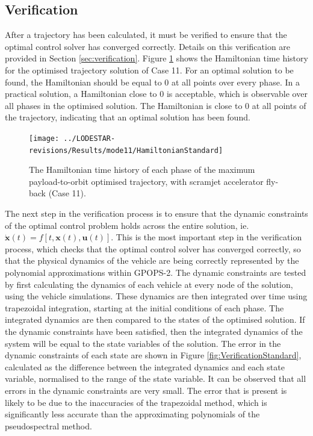 \subsection{Verification}

After a trajectory has been calculated, it must be verified to ensure that the optimal control solver has converged correctly. Details on this verification are provided in Section \ref{sec:verification}. Figure \ref{fig:HamiltonianStandard} shows the Hamiltonian time history for the optimised trajectory solution of Case 11. For an optimal solution to be found, the Hamiltonian should be equal to 0 at all points over every phase. In a practical solution, a Hamiltonian close to 0 is acceptable, which is observable over all phases in the optimised solution. The Hamiltonian is close to 0 at all points of the trajectory, indicating that an optimal solution has been found. 
\begin{figure}[ht]
	\centering
	\texttt{[image: ../LODESTAR-revisions/Results/mode11/HamiltonianStandard]}
	\caption{The Hamiltonian time history of each phase of the maximum payload-to-orbit optimised trajectory, with scramjet accelerator fly-back (Case 11).}
	\label{fig:HamiltonianStandard}
\end{figure}

The next step in the verification process is to ensure that the dynamic constraints of the optimal control problem holds across the entire solution, ie. $\dot{\textbf{x}}(t) = f[t,\textbf{x}(t),\textbf{u}(t)]$. This is the most important step in the verification process, which checks that the optimal control solver has converged correctly, so that the physical dynamics of the vehicle are being correctly represented by the polynomial approximations within GPOPS-2. The dynamic constraints are tested by first calculating the dynamics of each vehicle at every node of the solution, using the vehicle simulations. These dynamics are then integrated over time using trapezoidal integration, starting at the initial conditions of each phase. The integrated dynamics are then compared to the states of the optimised solution. If the dynamic constraints have been satisfied, then the integrated dynamics of the system will be equal to the state variables of the solution. The error in the dynamic constraints of each state are shown in Figure \ref{fig:VerificationStandard}, calculated as the difference between the integrated dynamics and each state variable, normalised to the range of the state variable. 
It can be observed that all errors in the dynamic constraints are very small. The error that is present is likely to be due to the inaccuracies of the trapezoidal method, which is significantly less accurate than the approximating polynomials of the pseudospectral method. 




